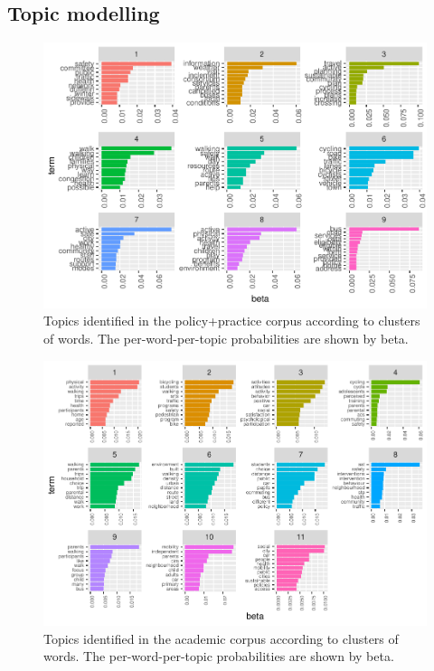 \documentclass[preprint, 3p,
authoryear]{elsarticle} %
\begin{document}
\hypertarget{topic-modelling}{%
\subsection{Topic modelling}\label{topic-modelling}}

\begin{figure}
\includegraphics[width=1\linewidth]{AST-Framing-Ontario_files/figure-latex/policy-terms-1} \caption{\label{fig:policy-terms}Topics identified in the policy+practice corpus according to clusters of words. The per-word-per-topic probabilities are shown by beta.}\label{fig:policy-terms}
\end{figure}

\begin{figure}
\includegraphics[width=1\linewidth]{AST-Framing-Ontario_files/figure-latex/academic-terms-1} \caption{\label{fig:academic-terms}Topics identified in the academic corpus according to clusters of words. The per-word-per-topic probabilities are shown by beta.}\label{fig:academic-terms}
\end{figure}
\end{document}
